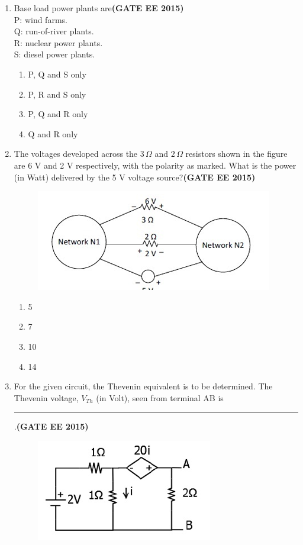 \documentclass[a4paper,12pt]{exam}
\theoremstyle{remark}
\begin{document}
\begin{enumerate}
\item Base load power plants are\hfill{\textbf{(GATE EE 2015)}}\\
P: wind farms.\\
Q: run-of-river plants.\\
R: nuclear power plants.\\
S: diesel power plants.
\begin{multicols}{2}
    \begin{enumerate}
        \item P, Q and S only
        \item P, R and S only
        \item P, Q and R only
        \item Q and R only
    \end{enumerate}
\end{multicols}
\item The voltages developed across the $3\,\Omega$ and $2\,\Omega$ resistors shown in the figure are 6 V and 2 V respectively, with the polarity as marked. What is the power (in Watt) delivered by the 5 V voltage source?\hfill{\textbf{(GATE EE 2015)}}
\begin{figure}[H]
    \centering
    \includegraphics[width=0.5\columnwidth]{figs/Q 28.png}
    \caption{}
    \label{fig:placeholder}
\end{figure}
\begin{multicols}{4}
    \begin{enumerate}
        \item 5
        \item 7
        \item 10
        \item 14
    \end{enumerate}
\end{multicols}
\item For the given circuit, the Thevenin equivalent is to be determined. The Thevenin voltage, $V_{Th}$ (in Volt), seen from terminal AB is \rule{3cm}{0.15mm}.\hfill{\textbf{(GATE EE 2015)}}
\begin{figure}[H]
    \centering
    \includegraphics[width=0.4\columnwidth]{figs/Q 29.png}

\end{figure}
\end{enumerate}
\end{document}

